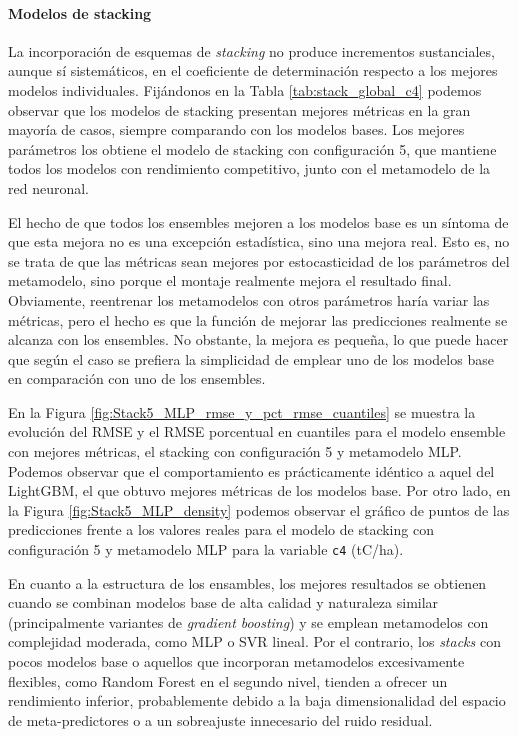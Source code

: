 \paragraph{Modelos de stacking}

La incorporación de esquemas de \textit{stacking} no produce incrementos sustanciales, aunque sí sistemáticos, en el coeficiente de determinación respecto a los mejores modelos individuales. Fijándonos en la Tabla \ref{tab:stack_global_c4} podemos observar que los modelos de stacking presentan mejores métricas en la gran mayoría de casos, siempre comparando con los modelos bases. Los mejores parámetros los obtiene el modelo de stacking con configuración 5, que mantiene todos los modelos con rendimiento competitivo, junto con el metamodelo de la red neuronal.

El hecho de que todos los ensembles mejoren a los modelos base es un síntoma de que esta mejora no es una excepción estadística, sino una mejora real. Esto es, no se trata de que las métricas sean mejores por estocasticidad de los parámetros del metamodelo, sino porque el montaje realmente mejora el resultado final. Obviamente, reentrenar los metamodelos con otros parámetros haría variar las métricas, pero el hecho es que la función de mejorar las predicciones realmente se alcanza con los ensembles. No obstante, la mejora es pequeña, lo que puede hacer que según el caso se prefiera la simplicidad de emplear uno de los modelos base en comparación con uno de los ensembles. 

En la Figura \ref{fig:Stack5_MLP_rmse_y_pct_rmse_cuantiles} se muestra la evolución del RMSE y el RMSE porcentual en cuantiles para el modelo ensemble con mejores métricas, el stacking con configuración 5 y metamodelo MLP. Podemos observar que el comportamiento es prácticamente idéntico a aquel del LightGBM, el que obtuvo mejores métricas de los modelos base. 
Por otro lado, en la Figura \ref{fig:Stack5_MLP_density} podemos observar el gráfico de puntos de las predicciones frente a los valores reales para el modelo de stacking con configuración 5 y metamodelo MLP para la variable \texttt{c4} (tC/ha).






En cuanto a la estructura de los ensambles, los mejores resultados se obtienen cuando se combinan modelos base de alta calidad y naturaleza similar (principalmente variantes de \textit{gradient boosting}) y se emplean metamodelos con complejidad moderada, como MLP o SVR lineal. Por el contrario, los \textit{stacks} con pocos modelos base o aquellos que incorporan metamodelos excesivamente flexibles, como Random Forest en el segundo nivel, tienden a ofrecer un rendimiento inferior, probablemente debido a la baja dimensionalidad del espacio de meta-predictores o a un sobreajuste innecesario del ruido residual.




